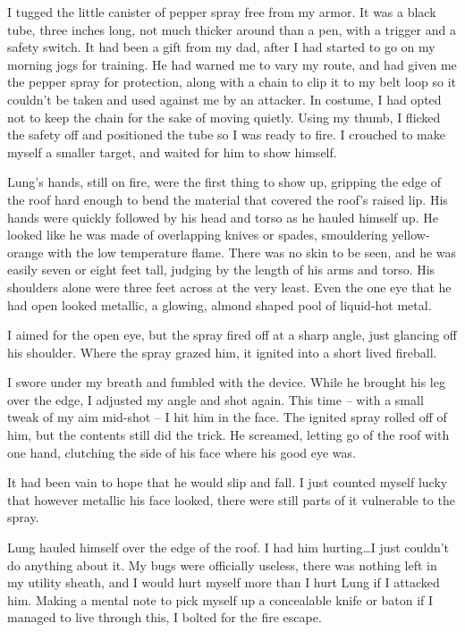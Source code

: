 I tugged the little canister of pepper spray free from my armor.  It was a black tube, three inches long, not much thicker around than a pen, with a trigger and a safety switch.  It had been a gift from my dad, after I had started to go on my morning jogs for training.  He had warned me to vary my route, and had given me the pepper spray for protection, along with a chain to clip it to my belt loop so it couldn't be taken and used against me by an attacker.  In costume, I had opted not to keep the chain for the sake of moving quietly.  Using my thumb, I flicked the safety off and positioned the tube so I was ready to fire.  I crouched to make myself a smaller target, and waited for him to show himself.



Lung's hands, still on fire, were the first thing to show up, gripping the edge of the roof hard enough to bend the material that covered the roof's raised lip.  His hands were quickly followed by his head and torso as he hauled himself up.  He looked like he was made of overlapping knives or spades, smouldering yellow-orange with the low temperature flame.  There was no skin to be seen, and he was easily seven or eight feet tall, judging by the length of his arms and torso.  His shoulders alone were three feet across at the very least.  Even the one eye that he had open looked metallic, a glowing, almond shaped pool of liquid-hot metal.



I aimed for the open eye, but the spray fired off at a sharp angle, just glancing off his shoulder.  Where the spray grazed him, it ignited into a short lived fireball.



I swore under my breath and fumbled with the device.  While he brought his leg over the edge, I adjusted my angle and shot again.  This time – with a small tweak of my aim mid-shot – I hit him in the face.  The ignited spray rolled off of him, but the contents still did the trick.  He screamed, letting go of the roof with one hand, clutching the side of his face where his good eye was.



It had been vain to hope that he would slip and fall.  I just counted myself lucky that however metallic his face looked, there were still parts of it vulnerable to the spray.



Lung hauled himself over the edge of the roof.  I had him hurting\ldots I just couldn't do anything about it.  My bugs were officially useless, there was nothing left in my utility sheath, and I would hurt myself more than I hurt Lung if I attacked him.  Making a mental note to pick myself up a concealable knife or baton if I managed to live through this, I bolted for the fire escape.



